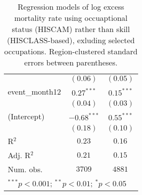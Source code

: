 \begin{table}
\begin{center}
\begin{tabular}{l c c}
               & $(0.06)$      & $(0.05)$      \\
event\_month12 & $0.27^{***}$  & $0.15^{***}$  \\
               & $(0.04)$      & $(0.03)$      \\
(Intercept)    & $-0.68^{***}$ & $0.55^{***}$  \\
               & $(0.18)$      & $(0.10)$      \\
\hline
R$^2$          & $0.23$        & $0.16$        \\
Adj. R$^2$     & $0.21$        & $0.15$        \\
Num. obs.      & $3709$        & $4881$        \\
\hline
\multicolumn{3}{l}{\scriptsize{$^{***}p<0.001$; $^{**}p<0.01$; $^{*}p<0.05$}}
\end{tabular}
\caption{Regression models of log excess mortality rate using occuaptional status (HISCAM) rather than skill (HISCLASS-based), exluding selected occupations. Region-clustered standard errors between parentheses.}
\label{tab:hiscammodels}
\end{center}
\end{table}
